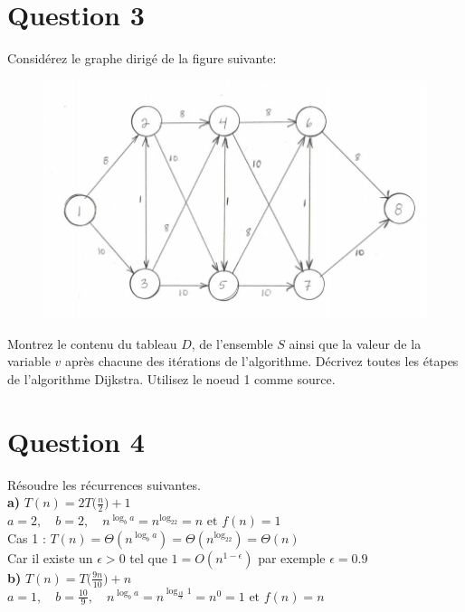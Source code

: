 \documentclass[12pt]{article}
\begin{document}
\section*{Question 3}
Considérez le graphe dirigé de la figure suivante:

\begin{figure}[H]
	\centering
	\includegraphics[width=12cm]{q3}
\end{figure}

Montrez le contenu du tableau \(D\), de l’ensemble \(S\) ainsi que la valeur de la variable \(v\) après chacune des itérations de l’algorithme. Décrivez toutes les étapes de l’algorithme Dijkstra. Utilisez le noeud 1 comme source.

\newpage

\section*{Question 4}
Résoudre les récurrences suivantes. \\

\textbf{a) } \(T(n)=2T\big(\frac{n}{2}\big)+1\) \\

\(a=2, \quad b=2, \quad n^{\log_ba} = n^{\log_22}=n \text{ et } f(n) = 1\) \\

Cas 1 : \(T(n) = \Theta(n^{\log_ba}) = \Theta(n^{\log_22}) = \Theta(n) \) \\

Car il existe un \(\epsilon>0\) tel que \(1 = O(n^{1-\epsilon}) \) par exemple \(\epsilon=0.9\) \\

\textbf{b) } \(T(n)=T\big(\frac{9n}{10}\big)+n\) \\

\(a=1, \quad b=\frac{10}{9}, \quad n^{\log_ba} = n^{\log_{\frac{10}{9}}1}=n^0=1 \text{ et } f(n) = n\) \\
\end{document}
